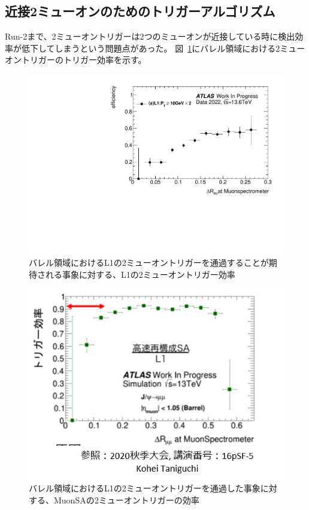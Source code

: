 \subsection{近接2ミューオンのためのトリガーアルゴリズム}\label{chapter3-3-1}
Run-2まで、2ミューオントリガーは2つのミューオンが近接している時に検出効率が低下してしまうという問題点があった。
図~\ref{fig:3-12}にバレル領域における2ミューオントリガーのトリガー効率を示す。

\begin{figure}[H]
    \centering
    \includegraphics[clip, width=12cm]{fig/3/L1_2MU10_eff.pdf}
    \caption{バレル領域におけるL1の2ミューオントリガーを通過することが期待される事象に対する、L1の2ミューオントリガー効率}
    \label{fig:3-12}
\end{figure}

\begin{figure}[H]
    \centering
    \includegraphics[clip, width=12cm]{fig/3/l2saEff_taniguchi.png}
    \caption{バレル領域におけるL1の2ミューオントリガーを通過した事象に対する、MuonSAの2ミューオントリガーの効率}
    \label{fig:3-13}
\end{figure}

